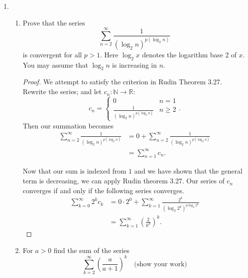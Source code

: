 \documentclass{article}
\begin{document}
\begin{enumerate} 

\item \begin{enumerate}
        \item Prove that the series $$\sum_{n=2}^\infty\frac1{(\log_2n)^{p(\log_2n)}}$$
        is convergent for all $p>1.$ Here $\log_2x$ denotes the logarithm base 2 of $x.$ You may assume
        that $\log_2n$ is increasing in $n.$

        \begin{proof} 
            We attempt to satisfy the criterion in Rudin Theorem 3.27. Rewrite the series; 
            and let $c_n:\mathbb{N}\to \mathbb{R}$:
            \[
            c_n=\begin{cases}
                0&n=1\\
                \frac1{(\log_2n)^{p(\log_2n)}}&n\ge 2
            \end{cases}
            .\] 
            Then our summation becomes
            \begin{align*}
                \sum_{n=2}^\infty\frac1{(\log_2n)^{p(\log_2n)}}&= 0+\sum_{n=2}^\infty\frac1{(\log_2n)^{p(\log_2n)}} \\
                &= \sum_{n=1}^{\infty} c_n
            .\end{align*}

            Now that our sum is indexed from $1$ and we have shown that the general term is decreasing,
            we can apply Rudin theorem 3.27. Our series of $c_n$ converges if and only if the following 
            series converges.
            \begin{align*}
                \sum_{k=0}^{\infty} 2^kc_k
                &= 0\cdot 2^0+  \sum_{k=1}^{\infty} \frac{2^k}{\left(\log_2 2^k\right)^{p\log_2 2^k}} \\
                &= \sum_{k=1}^{\infty} \left( \frac{2}{k^{p}} \right) ^{k} 
            .\end{align*}   

        \end{proof}

        \item For $a>0$ find the sum of the series
        $$\sum_{k=2}^\infty\left(\frac a{a+1}\right)^k\quad\text{(show your work)}$$


\end{enumerate}
\end{enumerate}
\end{document}
